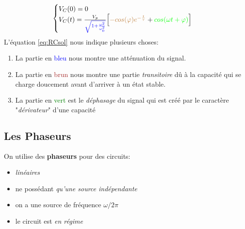 \documentclass{report}
\begin{document}
\begin{equation} 
\begin{cases}
V_C(0) = 0\\
V_C(t) = \frac{V_p}{\textcolor{blue}{\sqrt{1 + \frac{\omega^2}{\omega_0^2}}}} \Bigl[\textcolor{brown}{-cos(\varphi)e^{-\frac{t}{\tau}}} + \textcolor{green}{cos(\omega t + \varphi)} \Bigl] \label{eq:RCsol}
\end{cases} 
\end{equation}
L'équation \ref{eq:RCsol} nous indique plusieurs choses:
\begin{enumerate}
\item La partie en \textcolor{blue}{bleu} nous montre une atténuation du signal.
\item La partie en \textcolor{brown}{brun} nous montre une partie \textit{transitoire} dû à la capacité qui se charge doucement avant d'arriver à un état stable.
\item La partie en \textcolor{green}{vert} est le \textit{déphasage} du signal qui est créé par le caractère "\textit{dérivateur}" d'une capacité
\end{enumerate}


\subsection{Les Phaseurs}
On utilise des \textbf{phaseurs} pour des circuits:
\begin{itemize}
\item \textit{linéaires}
\item  ne possédant \textit{qu'une source indépendante}
\item on a une source de fréquence $\omega/ 2\pi$
\item le circuit est \textit{en régime}
\end{itemize}
\end{document}
